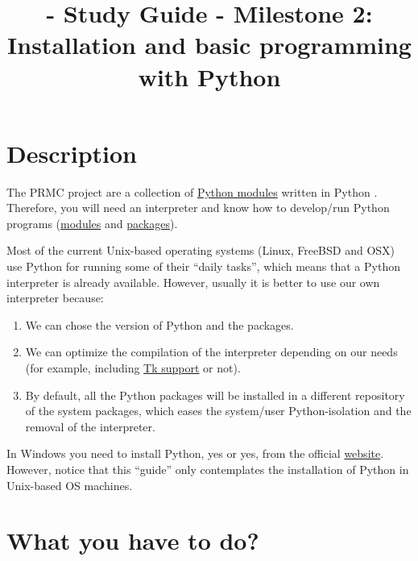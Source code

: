 
\title{\SM - Study Guide - Milestone 2: Installation and basic programming with Python}

\maketitle

\tableofcontents

\section{Description}

The PRMC project are a collection of
\href{https://docs.python.org/3/tutorial/modules.html#}{Python
  modules} written in Python \cite{Python}. Therefore, you will need
an interpreter and know how to develop/run Python programs
(\href{https://docs.python.org/3/tutorial/modules.html#modules}{modules}
and
\href{https://docs.python.org/3/tutorial/modules.html#packages}{packages}).

Most of the current Unix-based operating systems (Linux, FreeBSD and
OSX) use Python for running some of their ``daily tasks'', which means
that a Python interpreter is already available. However, usually it is
better to use our own interpreter because:

\begin{enumerate}

\item We can chose the version of Python and the packages.

\item We can optimize the compilation of the interpreter depending on
  our needs (for example, including
  \href{https://wiki.python.org/moin/TkInter}{Tk support} or not).

\item By default, all the Python packages will be installed in a
  different repository of the system packages, which eases the
  system/user Python-isolation and the removal of the interpreter.

\end{enumerate}

In Windows you need to install Python, yes or yes, from the official
\href{https://www.python.org/downloads/}{website}. However, notice
that this ``guide'' only contemplates the installation of Python in
Unix-based OS machines.

\section{What you have to do?}

